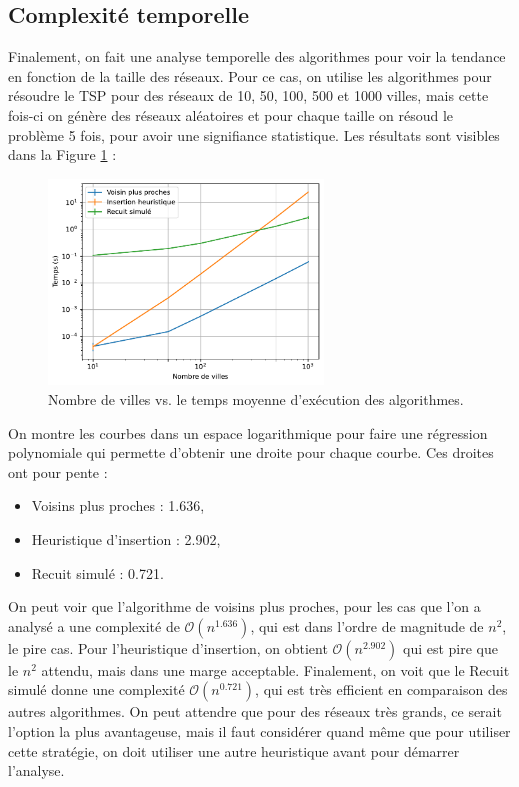 \documentclass[a4paper,11pt,fleqn]{article}
\begin{document}
\subsection*{Complexité temporelle}
Finalement, on fait une analyse temporelle des algorithmes pour voir la tendance en fonction de la taille des réseaux. Pour ce cas, on utilise les algorithmes pour résoudre le TSP pour des réseaux de 10, 50, 100, 500 et 1000 villes, mais cette fois-ci on génère des réseaux aléatoires et pour chaque taille on résoud le problème 5 fois, pour avoir une signifiance statistique. Les résultats sont visibles dans la Figure \ref{fig:temps} :

\begin{figure}[H]
    \centering
    \includegraphics[width=0.65\textwidth]{images/complexite_temporelle.pdf}
    \caption{Nombre de villes vs. le temps moyenne d'exécution des algorithmes.}
    \label{fig:temps}
\end{figure}

On montre les courbes dans un espace logarithmique pour faire une régression polynomiale qui permette d'obtenir une droite pour chaque courbe. Ces droites ont pour pente :

\begin{itemize}
    \item Voisins plus proches : 1.636,
    \item Heuristique d'insertion : 2.902,
    \item Recuit simulé : 0.721.
\end{itemize}

On peut voir que l'algorithme de voisins plus proches, pour les cas que l'on a analysé a une complexité de $\mathcal{O}(n^{1.636})$, qui est dans l'ordre de magnitude de $n^2$, le pire cas. Pour l'heuristique d'insertion, on obtient $\mathcal{O}(n^{2.902})$ qui est pire que le $n^2$ attendu, mais dans une marge acceptable. Finalement, on voit que le Recuit simulé donne une complexité $\mathcal{O}(n^{0.721})$, qui est très efficient en comparaison des autres algorithmes. On peut attendre que pour des réseaux très grands, ce serait l'option la plus avantageuse, mais il faut considérer quand même que pour utiliser cette stratégie, on doit utiliser une autre heuristique avant pour démarrer l'analyse.
\end{document}
